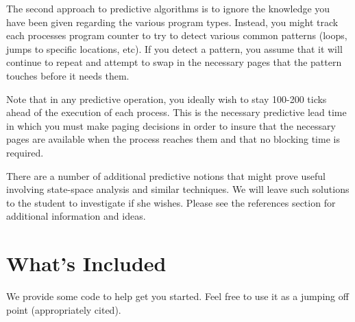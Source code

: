 \documentclass[12pt]{article}
\begin{document}
The second approach to predictive algorithms is to ignore the
knowledge you have been given regarding the various program
types. Instead, you might track each processes program counter to try
to detect various common patterns (loops, jumps to specific locations,
etc). If you detect a pattern, you assume that it will continue to
repeat and attempt to swap in the necessary pages that the pattern
touches before it needs them.

Note that in any predictive operation, you ideally wish to stay
100-200 ticks ahead of the execution of each process. This is the
necessary predictive lead time in which you must make paging decisions
in order to insure that the necessary pages are available when the
process reaches them and that no blocking time is required.

There are a number of additional predictive notions that might prove
useful involving state-space analysis and similar techniques. We
will leave such solutions to the student to investigate if she
wishes. Please see the references section for additional information
and ideas.

\section{What's Included}

We provide some code to help get you started. Feel free to use it as a
jumping off point (appropriately cited).
\end{document}
